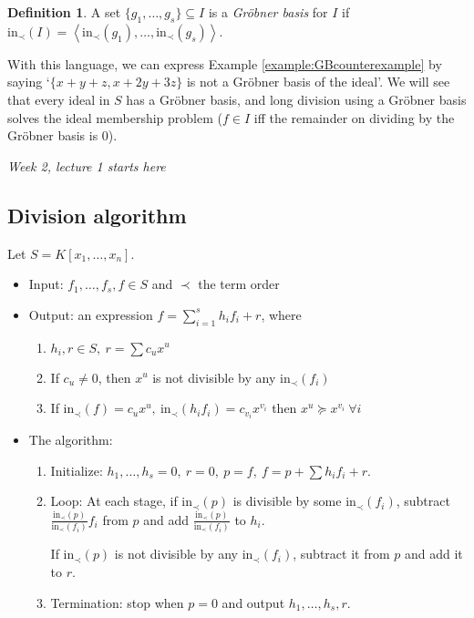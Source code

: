 \documentclass[a4paper]{article}
\newcommand{\la}{\left\langle}
\newcommand{\ra}{\right\rangle}
\newcommand{\In}{\text{in}}
\theoremstyle{definition}
\newtheorem{defn}{Definition}[subsection]
\begin{document}
\begin{defn}
A set $\{g_1,\ldots,g_s\}\subseteq I$ is a \textit{Gröbner basis} for $I$ if $\In_\prec (I)=\la \In_\prec (g_1),\ldots,\In_\prec (g_s)\ra$.
\end{defn}
With this language, we can express Example \ref{example:GBcounterexample} by saying `$\{x+y+z,x+2y+3z\}$ is not a Gröbner basis of the ideal'. We will see that every ideal in $S$ has a Gröbner basis, and long division using a Gröbner basis solves the ideal membership problem ($f\in I$ iff the remainder on dividing by the Gröbner basis is 0).

\begin{flushright}
\textit{Week 2, lecture 1 starts here}
\end{flushright}

\subsection{Division algorithm}
Let $S=K[x_1,\ldots,x_n]$.
\begin{itemize}
\item Input: $f_1,\ldots,f_s,f\in S$ and $\prec$ the term order
\item Output: an expression $f=\sum_{i=1}^s h_i f_i+r$, where
\begin{enumerate}
\item $h_i,r\in S,\ r=\sum c_u x^u$
\item If $c_u\neq 0$, then $x^u$ is not divisible by any $\In_\prec (f_i)$
\item If $\In_\prec(f)=c_u x^u,\ \In_\prec(h_i f_i)=c_{v_i}x^{v_i}$ then $x^u\succeq x^{v_i} \ \forall i$
\end{enumerate}
\item The algorithm:\begin{enumerate}
\item Initialize: $h_1,\ldots,h_s=0,\ r=0,\ p=f,\ f=p+\sum h_i f_i+r$.
\item Loop: At each stage, if $\In_\prec(p)$ is divisible by some $\In_\prec(f_i)$, subtract $\frac{\In_\prec(p)}{\In_\prec(f_i)}f_i$ from $p$ and add $\frac{\In_\prec(p)}{\In_\prec(f_i)}$ to $h_i$.

If $\In_\prec(p)$ is not divisible by any $\In_\prec(f_i)$, subtract it from $p$ and add it to $r$.
\item Termination: stop when $p=0$ and output $h_1,\ldots,h_s,r$.
\end{enumerate}
\end{itemize}
\end{document}
